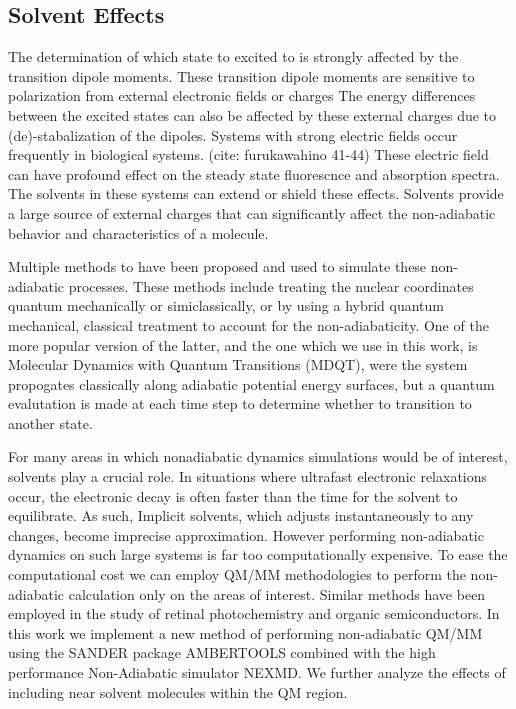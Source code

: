 \subsection{Solvent Effects}
The determination of which state to excited to is strongly affected by the transition dipole moments.
These transition dipole moments are sensitive to polarization from external electronic fields or charges
The energy differences between the excited states can also be affected by these external charges due to (de)-stabalization of the dipoles.
Systems with strong electric fields occur frequently in biological systems. (cite: furukawahino 41-44)
These electric field can have profound effect on the steady state fluorescnce and absorption spectra. \cite{park2013}
The solvents in these systems can extend or shield these effects.
Solvents provide a large source of external charges that can significantly affect the non-adiabatic behavior and characteristics of a molecule.\cite{furukawa2015external}

Multiple methods to have been proposed and used to simulate these non-adiabatic processes.
These methods include treating the nuclear coordinates quantum mechanically or simiclassically, or by using a hybrid quantum mechanical, classical treatment to account for the non-adiabaticity.
One of the more popular version of the latter, and the one which we use in this work, is Molecular Dynamics with Quantum Transitions (MDQT), were the system propogates classically along adiabatic potential energy surfaces, but a quantum evalutation is made at each time step to determine whether to transition to another state.

For many areas in which nonadiabatic dynamics simulations would be of interest, solvents play a crucial role.
\cite{bagchi1989dynamics,woo2005solvent}
    In situations where ultrafast electronic relaxations occur, the electronic decay is often faster than the time for the solvent to equilibrate.
    As such, Implicit solvents, which adjusts instantaneously to any changes, become imprecise approximation.
    However performing non-adiabatic dynamics on such large systems is far too computationally expensive.
    To ease the computational cost we can employ QM/MM methodologies to perform the non-adiabatic calculation only on the areas of interest.
    Similar methods have been employed in the study of retinal photochemistry and organic semiconductors.\cite{weingart2012modelling,demoulin2017fine,heck2015multi,bayliss1954solvent}%
    In this work we implement a new method of performing non-adiabatic QM/MM using the SANDER package AMBERTOOLS combined with the high performance Non-Adiabatic simulator NEXMD.
    We further analyze the effects of including near solvent molecules within the QM region.

